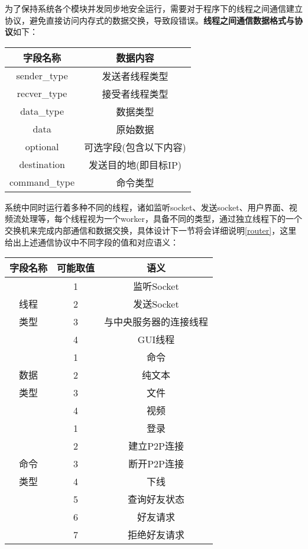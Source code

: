 \documentclass[UTF8]{ctexart}
\begin{document}
为了保持系统各个模块并发同步地安全运行，需要对于程序下的线程之间通信建立协议，避免直接访问内存式的数据交换，导致段错误。\textbf{线程之间通信数据格式与协议}如下：
\begin{table}[H]
    \centering
    \begin{tabular}{cc}
        \hline
        字段名称 & 数据内容 \\
        \hline
        sender\_type & 发送者线程类型\\
        recver\_type & 接受者线程类型\\
        data\_type & 数据类型\\
        data & 原始数据 \\
        optional & 可选字段(包含以下内容)\\
        destination & 发送目的地(即目标IP)\\
        command\_type&命令类型\\
        \hline
    \end{tabular}
\end{table}

系统中同时运行着多种不同的线程，诸如监听socket、发送socket、用户界面、视频流处理等，每个线程视为一个worker，具备不同的类型，通过独立线程下的一个交换机来完成内部通信和数据交换，具体设计下一节将会详细说明\ref{router}，这里给出上述通信协议中不同字段的值和对应语义：
\begin{table}[H]
    \centering
    \begin{tabular}{ccc}
        \hline
        字段名称 & 可能取值 & 语义\\
        \hline
        & 1 & 监听Socket\\
        线程&2&发送Socket\\
        类型&3&与中央服务器的连接线程\\
        &4&GUI线程\\
        \hline
        &1&命令\\
        数据&2&纯文本\\
        类型&3&文件\\
        &4&视频\\
        \hline
        &1&登录\\
        &2&建立P2P连接\\
        命令&3&断开P2P连接\\
        类型&4&下线\\
        &5&查询好友状态\\
        &6&好友请求\\
        &7&拒绝好友请求\\
        \hline
    \end{tabular}
\end{table}
\end{document}
